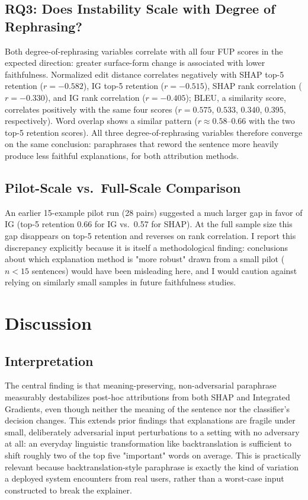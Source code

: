 \subsection{RQ3: Does Instability Scale with Degree of Rephrasing?}

Both degree-of-rephrasing variables correlate with all four FUP scores
in the expected direction: greater surface-form change is associated
with lower faithfulness. Normalized edit distance correlates negatively
with SHAP top-5 retention ($r = -0.582$), IG top-5 retention
($r=-0.515$), SHAP rank correlation ($r=-0.330$), and IG rank
correlation ($r=-0.405$); BLEU, a similarity score, correlates
positively with the same four scores ($r = 0.575$, $0.533$, $0.340$,
$0.395$, respectively). Word overlap shows a similar pattern
($r \approx 0.58$--$0.66$ with the two top-5 retention scores). All three
degree-of-rephrasing variables therefore converge on the same
conclusion: paraphrases that reword the sentence more heavily produce
less faithful explanations, for both attribution methods.

\subsection{Pilot-Scale vs.\ Full-Scale Comparison}

An earlier 15-example pilot run (28 pairs) suggested a much larger gap
in favor of IG (top-5 retention 0.66 for IG vs.\ 0.57 for SHAP). At the
full sample size this gap disappears on top-5 retention and reverses on
rank correlation. I report this discrepancy explicitly because it is
itself a methodological finding: conclusions about which explanation
method is "more robust" drawn from a small pilot ($n < 15$ sentences)
would have been misleading here, and I would caution against relying on
similarly small samples in future faithfulness studies.

\section{Discussion}
\label{sec:discussion}

\subsection{Interpretation}

The central finding is that meaning-preserving, non-adversarial
paraphrase measurably destabilizes post-hoc attributions from both SHAP
and Integrated Gradients, even though neither the meaning of the
sentence nor the classifier's decision changes. This extends prior
findings that explanations are fragile under small, deliberately
adversarial input perturbations
\citep{ghorbani2019interpretation,adebayo2018sanity,slack2020fooling,ivankay2022fooling,ivankay2022estimating}
to a setting with no adversary at all: an everyday linguistic
transformation like backtranslation is sufficient to shift roughly two
of the top five "important" words on average. This is practically
relevant because backtranslation-style paraphrase is exactly the kind of
variation a deployed system encounters from real users, rather than a
worst-case input constructed to break the explainer.

